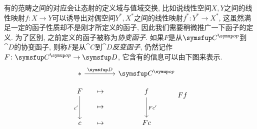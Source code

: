 有的范畴之间的对应会让态射的定义域与值域交换, 比如说线性空间$X, Y$之间的线性映射$f\colon X\to Y$可以诱导出对偶空间$Y^*, X^*$之间的线性映射$f^*\colon Y^*\to X^*$, 这虽然满足一定的函子性质却不是刚才所定义的函子, 因此我们需要稍微推广一下函子的定义. 为了区别, 之前定义的函子被称为\emph{协变函子}. 如果$F$是从$\cat{C}^{\op}$到$\cat{D}$的协变函子, 则称$F$是从$\cat{C}$到$\cat{D}$\emph{反变函子}, 仍然记作$F\colon \cat{C}^{\op}\to\cat{D}$, 它含有的信息可以由下图来表示\footnotemark.
\begin{equation}
  \functordiagram*{\cat{C}^{\op}}{\cat{D}}{F}{c}{c'}{f}{Fc}{Fc'}{Ff}
\end{equation}

